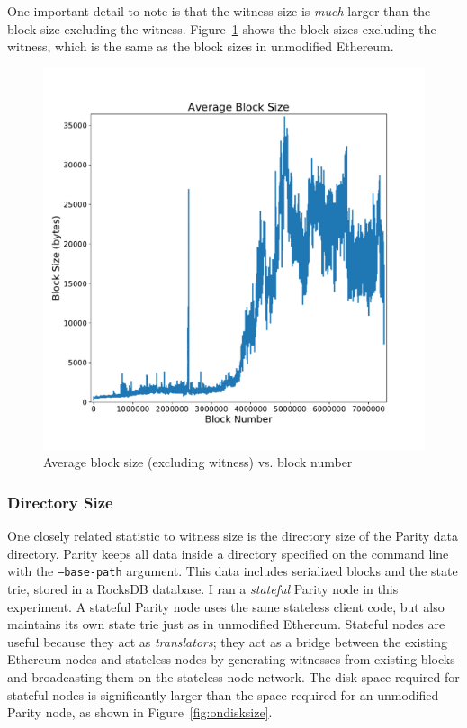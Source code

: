 \documentclass[12pt]{article}
\begin{document}
One important detail to note is that the witness size is \emph{much} larger than the block size excluding the witness. Figure~\ref{fig:blocksize} shows the block sizes excluding the witness, which is the same as the block sizes in unmodified Ethereum.

\begin{figure}[H]
  \centering
  \includegraphics[width=\textwidth]{../figures/results/graphs/background/block-size.pdf}
  \caption{Average block size (excluding witness) vs. block number}
  \label{fig:blocksize}
\end{figure}


\subsubsection{Directory Size}

One closely related statistic to witness size is the directory size of the Parity data directory. Parity keeps all data inside a directory specified on the command line with the \texttt{--base-path} argument. This data includes serialized blocks and the state trie, stored in a RocksDB database. I ran a \emph{stateful} Parity node in this experiment. A stateful Parity node uses the same stateless client code, but also maintains its own state trie just as in unmodified Ethereum. Stateful nodes are useful because they act as \emph{translators}; they act as a bridge between the existing Ethereum nodes and stateless nodes by generating witnesses from existing blocks and broadcasting them on the stateless node network. The disk space required for stateful nodes is significantly larger than the space required for an unmodified Parity node, as shown in Figure~\ref{fig:ondisksize}.
\end{document}
